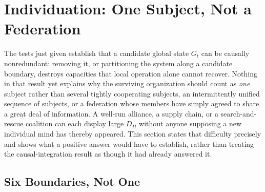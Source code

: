 \documentclass[11pt]{article}
\begin{document}
\section{Individuation: One Subject, Not a Federation}
\label{sec:individuation}

The tests just given establish that a candidate global state $G_t$ can be causally nonredundant: removing it, or partitioning the system along a candidate boundary, destroys capacities that local operation alone cannot recover. Nothing in that result yet explains why the surviving organization should count as \emph{one} subject rather than several tightly cooperating subjects, an intermittently unified sequence of subjects, or a federation whose members have simply agreed to share a great deal of information. A well-run alliance, a supply chain, or a search-and-rescue coalition can each display large $D_\Pi$ without anyone supposing a new individual mind has thereby appeared. This section states that difficulty precisely and shows what a positive answer would have to establish, rather than treating the causal-integration result as though it had already answered it.

\subsection{Six Boundaries, Not One}
\end{document}
